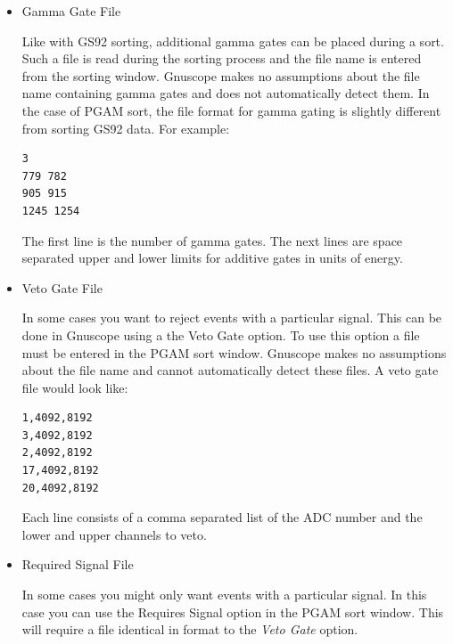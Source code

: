 \begin{itemize}
Finally, there is the ability to enter options.  Currently there is only the option to set the size of the two dimensional histograms by adding a line containing EDESIZE followed by the desired resolution.

Because there is a large amount of information in a setup file, the user can test a particular setup file by attempting to read it after starting Gnuscope in an Xterm (or another console).  If the setup file is faulty, the output in the xterm should allow the user to determine the problem.

\item{Gamma Gate File}

Like with GS92 sorting, additional gamma gates can be placed during a sort.  Such a file is read during the sorting process and the file name is entered from the sorting window.  Gnuscope makes no assumptions about the file name containing gamma gates and does not automatically detect them.  In the case of PGAM sort, the file format for gamma gating is slightly different from sorting GS92 data.  For example:

\begin{verbatim}
3
779 782
905 915
1245 1254
\end{verbatim}

The first line is the number of gamma gates.  The next lines are space separated upper and lower limits for additive gates in units of energy.

\item{Veto Gate File}

In some cases you want to reject events with a particular signal.  This can be done in Gnuscope using a the Veto Gate option.  To use this option a file must be entered in the PGAM sort window.  Gnuscope makes no assumptions about the file name and cannot automatically detect these files.  A veto gate file would look like:

\begin{verbatim}
1,4092,8192
3,4092,8192
2,4092,8192
17,4092,8192
20,4092,8192
\end{verbatim}

Each line consists of a comma separated list of the ADC number and the lower and upper channels to veto.

\item{Required Signal File}

In some cases you might only want events with a particular signal.  In this case you can use the Requires Signal option in the PGAM sort window.  This will require a file identical in format to the {\it Veto Gate} option.


\end{itemize}
